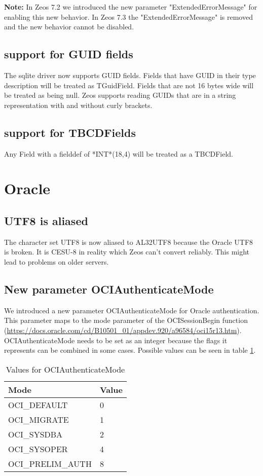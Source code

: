 \documentclass[a4paper,12pt,oneside]{article}
\begin{document}
\textbf{Note:}
In Zeos 7.2 we introduced the new parameter "ExtendedErrorMessage" for enabling this new behavior.
In Zeos 7.3 the "ExtendedErrorMessage" is removed and the new behavior cannot be disabled.

\subsection{support for GUID fields}
The sqlite driver now supports GUID fields.
Fields that have GUID in their type description will be treated as TGuidField.
Fields that are not 16 bytes wide will be treated as being null.
Zeos supports reading GUIDs that are in a string representation with and without curly brackets.

\subsection{support for TBCDFields}
Any Field with a fielddef of *INT*(18,4) will be treated as a TBCDField.

\section{Oracle}

\subsection{UTF8 is aliased}
The character set UTF8 is now aliased to AL32UTF8 because the Oracle UTF8 is broken.
It is CESU-8 in reality which Zeos can't convert reliably.
This might lead to problems on older servers.

\subsection{New parameter OCIAuthenticateMode}
\FloatBarrier
We introduced a new parameter OCIAuthenticateMode for Oracle authentication.
This parameter maps to the mode parameter of the OCISessionBegin function (\url{https://docs.oracle.com/cd/B10501_01/appdev.920/a96584/oci15r13.htm}).
OCIAuthenticateMode needs to be set as an integer because the flags it represents can be combined in some cases.
Possible values can be seen in table \ref{tbl:OCIAuthenticateModeValues}.

\begin{table}
    \begin{tabular}{ ll }
	  Mode & Value \\ \hline
    OCI\_DEFAULT & 0 \\
    OCI\_MIGRATE & 1 \\
    OCI\_SYSDBA & 2 \\
    OCI\_SYSOPER & 4 \\
    OCI\_PRELIM\_AUTH & 8 \\
	  \end{tabular}
    \caption{Values for OCIAuthenticateMode}
    \label{tbl:OCIAuthenticateModeValues}
\end{table}
\end{document}
